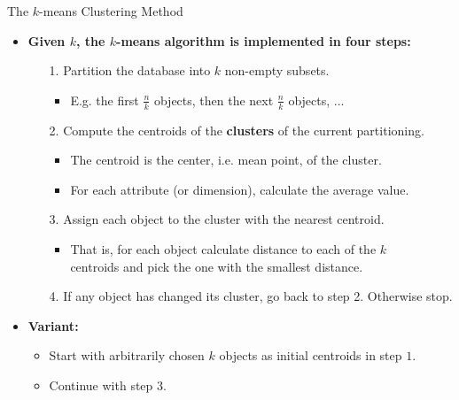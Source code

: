 \begin{frame}{The $k$-means Clustering Method}
	\begin{itemize}
		\item \textbf{Given $k$, the $k$-means algorithm is implemented in four
			      steps:}
		      \begin{itemize}
			      \item[1.] Partition the database into $k$ non-empty subsets.
				      \begin{itemize}
					      \item E.g. the first $\frac{n}{k}$ objects, then the next
					            $\frac{n}{k}$ objects, $\ldots$
				      \end{itemize}
			      \item[2.] Compute the centroids of the \textbf{clusters} of the
				      current partitioning.
				      \begin{itemize}
					      \item The centroid is the center, i.e. mean point, of the
					            cluster.
					      \item For each attribute (or dimension), calculate the average
					            value.
				      \end{itemize}
			      \item[3.] Assign each object to the cluster with the nearest
				      centroid.
				      \begin{itemize}
					      \item That is, for each object calculate distance to each of
					            the $k$\\
					            centroids and pick the one with the smallest distance.
				      \end{itemize}
			      \item[4.] If any object has changed its cluster, go back to step 2.
				      Otherwise stop.
		      \end{itemize}
		\item \textbf{Variant:}
		      \begin{itemize}
			      \item Start with arbitrarily chosen $k$ objects as initial
			            centroids in step $1$.
			      \item Continue with step $3$.
		      \end{itemize}
	\end{itemize}
\end{frame}

